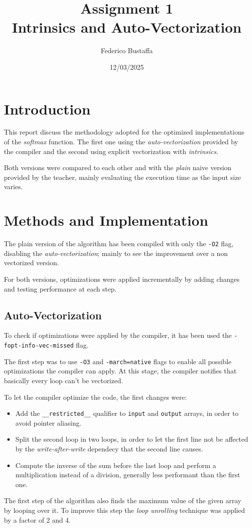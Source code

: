 \documentclass[12pt, a4paper]{article}
\title{Assignment 1\\Intrinsics and Auto-Vectorization}
\author{Federico Bustaffa}
\date{12/03/2025}
\begin{document}
\maketitle
\tableofcontents
\clearpage

\section{Introduction}

This report discuss the methodology adopted for the optimized implementations
of the \textit{softmax} function. The first one using the \textit{auto-vectorization}
provided by the compiler and the second using explicit vectorization with
\textit{intrinsics}.

Both versions were compared to each other and with the \textit{plain} naive
version provided by the teacher, mainly evaluating the execution time as the
input size varies.

\section{Methods and Implementation}

The plain version of the algorithm has been compiled with only the \verb|-O2|
flag, disabling the \textit{auto-vectorization}; mainly to see the improvement
over a non vectorized version.

For both versions, optimizations were applied incrementally by adding changes
and testing performance at each step.

\subsection{Auto-Vectorization}

To check if optimizations were applied by the compiler, it has been used the
\verb|-fopt-info-vec-missed| flag.

The first step was to use \verb|-O3| and \verb|-march=native| flags to enable
all possible optimizations the compiler can apply. At this stage, the compiler
notifies that basically every loop can't be vectorized.

To let the compiler optimize the code, the first changes were:
\begin{itemize}
	\item Add the \verb|__restricted__| qualifier to \verb|input| and
	      \verb|output| arrays, in order to avoid pointer aliasing.
	\item Split the second loop in two loops, in order to let the first line
	      not be affected by the \textit{write-after-write} dependecy that the
	      second line causes.
	\item Compute the inverse of the sum before the last loop and perform a
	      multiplication instead of a division, generally less performant than
	      the first one.
\end{itemize}
The first step of the algorithm also finds the maximum value of the given array
by looping over it. To improve this step the \textit{loop unrolling} technique
was applied by a factor of 2 and 4.
\end{document}
